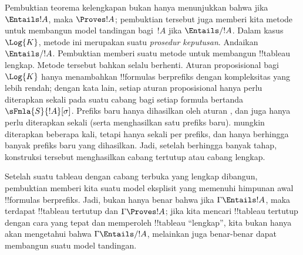 \documentclass[../../../include/open-logic-section]{subfiles}
\begin{document}
      

\begin{explain}
  Pembuktian teorema kelengkapan bukan hanya menunjukkan bahwa jika
  $\Entails !A$, maka $\Proves !A$; pembuktian tersebut juga memberi kita
  metode untuk membangun model tandingan bagi~$!A$ jika $\Entails/ !A$.
  Dalam kasus~$\Log{K}$, metode ini merupakan suatu \emph{prosedur
  keputusan}. Andaikan $\Entails/ !A$. Pembuktian
   memberi suatu metode untuk membangun
  !!{tableau} lengkap. Metode tersebut bahkan selalu berhenti. Aturan
  proposisional bagi~$\Log{K}$ hanya menambahkan !!{formula}s berprefiks
  dengan kompleksitas yang lebih rendah; dengan kata lain, setiap aturan
  proposisional hanya perlu diterapkan sekali pada suatu cabang bagi setiap
  formula bertanda $\sFmla{S}{!A}[\sigma]$. Prefiks baru hanya dihasilkan
  oleh aturan
  , dan
   juga hanya
  perlu diterapkan sekali (serta menghasilkan satu prefiks baru).
   mungkin diterapkan beberapa
  kali, tetapi hanya sekali per prefiks, dan hanya berhingga banyak prefiks
  baru yang dihasilkan. Jadi, setelah berhingga banyak tahap, konstruksi
  tersebut menghasilkan cabang tertutup atau cabang lengkap.

  Setelah suatu tableau dengan cabang terbuka yang lengkap dibangun,
  pembuktian  memberi kita suatu model
  eksplisit yang memenuhi himpunan awal !!{formula}s berprefiks. Jadi, bukan
  hanya benar bahwa jika $\Gamma \Entails !A$, maka terdapat !!{tableau}
  tertutup dan $\Gamma \Proves !A$; jika kita mencari !!{tableau} tertutup
  dengan cara yang tepat dan memperoleh !!{tableau} ``lengkap'', kita bukan
  hanya akan mengetahui bahwa $\Gamma \Entails/ !A$, melainkan juga benar-benar
  dapat membangun suatu model tandingan.
\end{explain}
\end{document}
